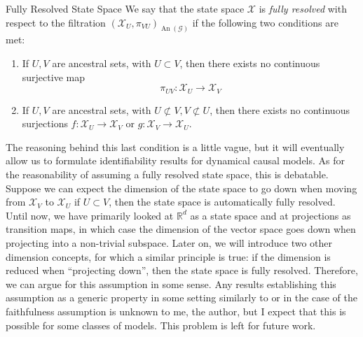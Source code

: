 \documentclass[11pt, a4paper]{memoir}
\theoremstyle{break}
\theoremstyle{break}
\theoremstyle{nonumberplain}
\newcommand{\mR}{\mathbb{R}}
\DeclareMathOperator{\an}{An}
\begin{document}
\begin{mydefinition}{Fully Resolved State Space}
We say that the state space $\mathcal{X}$ is \emph{fully resolved} with respect to the filtration $(\mathcal{X}_U,\pi_{VU})_{\an(\mathcal{G})}$ if the following two conditions are met:
\begin{enumerate}[label=\roman*)]
	\item If $U,V$ are ancestral sets, with $U\subset V$, then there exists no continuous surjective map
	$$\pi_{UV}:\mathcal{X}_{U}\to \mathcal{X}_V$$
	\item If $U,V$ are ancestral sets, with $U\not\subset V, V\not\subset U$, then there exists no continuous surjections
	$f:\mathcal{X}_U\to \mathcal{X}_V$ or $g:\mathcal{X}_V\to \mathcal{X}_U$.
\end{enumerate}
\end{mydefinition}
The reasoning behind this last condition is a little vague, but it will eventually allow us to formulate identifiability results for dynamical causal models. As for the reasonability of assuming a fully resolved state space, this is debatable. Suppose we can expect the dimension of the state space to go down when moving from $\mathcal{X}_V$ to $\mathcal{X}_U$ if $U\subset V$, then the state space is automatically fully resolved. Until now, we have primarily looked at $\mR^d$ as a state space and at projections as transition maps, in which case the dimension of the vector space goes down when projecting into a non-trivial subspace. Later on, we will introduce two other dimension concepts, for which a similar principle is true: if the dimension is reduced when \enquote{projecting down}, then the state space is fully resolved. Therefore, we can argue for this assumption in some sense. Any results establishing this assumption as a generic property in some setting similarly to \cite{Faithful1} or \cite{Spirtes} in the case of the faithfulness assumption is unknown to me, the author, but I expect that this is possible for some classes of models. This problem is left for future work.\\\\
\end{document}
